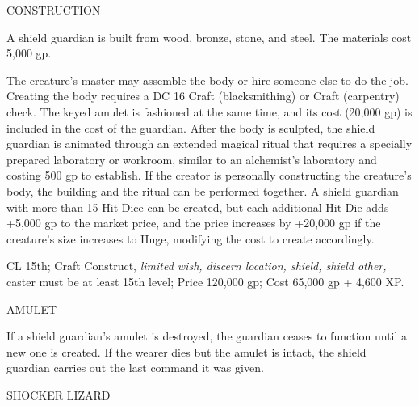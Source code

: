 \documentclass{article}
\begin{document}
CONSTRUCTION

A shield guardian is built from wood, bronze, stone, and steel. The materials cost 
5,000 gp.

The creature's master may assemble the body or hire someone else to do the job. 
Creating the body requires a DC 16 Craft (blacksmithing) or Craft (carpentry) check. 
The keyed amulet is fashioned at the same time, and its cost (20,000 gp) is included 
in the cost of the guardian. After the body is sculpted, the shield guardian is 
animated through an extended magical ritual that requires a specially prepared 
laboratory or workroom, similar to an alchemist's laboratory and costing 500 gp 
to establish. If the creator is personally constructing the creature's body, the 
building and the ritual can be performed together. A shield guardian with more 
than 15 Hit Dice can be created, but each additional Hit Die adds +5,000 gp to 
the market price, and the price increases by +20,000 gp if the creature's size 
increases to Huge, modifying the cost to create accordingly. 

CL 15th; Craft Construct, \textit{limited wish, discern location, shield, shield 
other, }caster must be at least 15th level; Price 120,000 gp; Cost 65,000 gp + 
4,600 XP.

AMULET

If a shield guardian's amulet is destroyed, the guardian ceases to function until 
a new one is created. If the wearer dies but the amulet is intact, the shield guardian 
carries out the last command it was given.

\vspace{12pt}
{\LARGE{}SHOCKER LIZARD}
\end{document}
